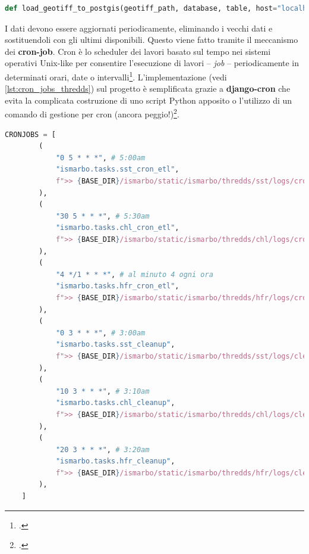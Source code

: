 \documentclass[./main.tex]{subfiles}
\begin{document}
\begin{lstlisting}[language=Python, 
    caption={Definzione funzione per il salvataggio dei dati GeoTIFF all'interno del database PostgreSQL.},
    label=lst:load_geotiff_to_postgis]
    def load_geotiff_to_postgis(geotiff_path, database, table, host="localhost", port=5432, user="your_username", password="your_password")
\end{lstlisting}

I dati devono essere aggiornati periodicamente, eliminando i vecchi dati e sostituendoli con gli ultimi disponibili.  Questo viene fatto tramite il meccanismo dei  \textbf{cron-job}. Cron è lo scheduler dei lavori basato sul tempo nei sistemi operativi Unix-like per consentire l'esecuzione di lavori -- \textit{job} -- periodicamente in determinati orari, date o intervalli\footcite[\url{https://wiki.archlinux.org/title/Cron}]{website-arch-wiki}. L'implementazione (vedi \autoref{lst:cron_jobs_thredds}) sul progetto è semplificata grazie a \textbf{django-cron} che evita la complicata costruzione di uno script Python apposito o l'utilizzo di un comando di gestione per cron (ancora peggio!)\footcite[\url{https://django-cron.readthedocs.io/en/latest/introduction.html}]{website-django-cron}. 

\begin{lstlisting}[language=Python, 
    caption={Definzione dei cron job per i dati dei cataloghi thredds. Lo scaricamento dei dati avviene chiamando le funzioni sst\_cron\_etl, chl\_cron\_etl e hfr\_cron\_etl, mentre l'elimanzione tramite le rispettive cleanup.},
    label=lst:cron_jobs_thredds]
    CRONJOBS = [
        (
            "0 5 * * *", # 5:00am
            "ismarbo.tasks.sst_cron_etl",
            f">> {BASE_DIR}/ismarbo/static/ismarbo/thredds/sst/logs/cronlogs.log 2>&1",
        ),
        (
            "30 5 * * *", # 5:30am
            "ismarbo.tasks.chl_cron_etl",
            f">> {BASE_DIR}/ismarbo/static/ismarbo/thredds/chl/logs/cronlogs.log 2>&1",
        ),
        (
            "4 */1 * * *", # al minuto 4 ogni ora
            "ismarbo.tasks.hfr_cron_etl",
            f">> {BASE_DIR}/ismarbo/static/ismarbo/thredds/hfr/logs/cronlogs.log 2>&1",
        ),
        (
            "0 3 * * *", # 3:00am
            "ismarbo.tasks.sst_cleanup",
            f">> {BASE_DIR}/ismarbo/static/ismarbo/thredds/sst/logs/cleanuplogs.log 2>&1",
        ),
        (
            "10 3 * * *", # 3:10am
            "ismarbo.tasks.chl_cleanup",
            f">> {BASE_DIR}/ismarbo/static/ismarbo/thredds/chl/logs/cleanup.log 2>&1",
        ),
        (
            "20 3 * * *", # 3:20am
            "ismarbo.tasks.hfr_cleanup",
            f">> {BASE_DIR}/ismarbo/static/ismarbo/thredds/hfr/logs/cleanup.log 2>&1",
        ),
    ]
\end{lstlisting}
\end{document}
